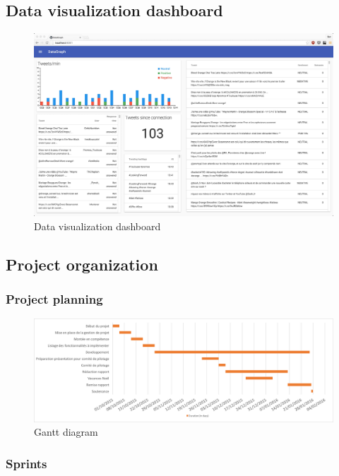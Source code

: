 \documentclass[11pt]{article}
\begin{document}
\subsection{Data visualization dashboard}

\begin{figure}[h!]
    \centering
    \includegraphics[scale=0.13]{img/dataviz2.png}
    \caption{Data visualization dashboard}
    \label{dataviz}
\end{figure}

\subsection{Project organization}

\subsubsection{Project planning}

\begin{figure}[h!]
    \centering
    \includegraphics[scale=0.5]{img/gantt.png}
    \caption{Gantt diagram}
    \label{gantt}
\end{figure}

\newpage
\subsubsection{Sprints}
\end{document}
